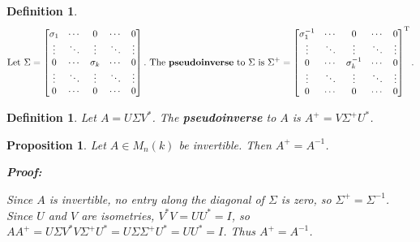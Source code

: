 \documentclass{article}
\theoremstyle{colontheorem}
\newtheorem{proposition}[theorem]{Proposition}
\newtheorem{definition}[theorem]{Definition}
\newenvironment{Proposition}
{
	\begin{mdframed}[backgroundcolor=TheoremOrange!10]
	\begin{proposition}
}
{
	\end{proposition}
	\end{mdframed}
	
	\vspace{.15in}
}
\newenvironment{Def}
{
	\begin{mdframed}[backgroundcolor=DefGreen!10]
	\begin{definition}
}
{
	\end{definition}
	\end{mdframed}
	
	\vspace{.15in}
}
\newenvironment{Proof}
{
	\begin{mdframed}[backgroundcolor=ProofPurple!10]
	\textbf{Proof:}%
}
{
	\end{mdframed}
	
	\vspace{.085in}
}
\begin{document}
\begin{Def}
	
	$$\textnormal{Let}\ \Sigma = \begin{bmatrix}
	
	\sigma_1 & \cdots & 0 & \cdots & 0\\
	\vdots & \ddots & \vdots & \ddots & \vdots\\
	0 & \cdots & \sigma_k & \cdots & 0\\
	\vdots & \ddots & \vdots & \ddots & \vdots\\
	0 & \cdots & 0 & \cdots & 0
	
	\end{bmatrix}.\ \textnormal{The \textbf{pseudoinverse} to}\ \Sigma\ \textnormal{is}\ \Sigma^+ = \begin{bmatrix}
	
	\sigma_1^{-1} & \cdots & 0 & \cdots & 0\\
	\vdots & \ddots & \vdots & \ddots & \vdots\\
	0 & \cdots & \sigma_k^{-1} & \cdots & 0\\
	\vdots & \ddots & \vdots & \ddots & \vdots\\
	0 & \cdots & 0 & \cdots & 0
	
	\end{bmatrix}^\textnormal{T}.
	$$
	
\end{Def}



\begin{Def}
	
	Let $A = U \Sigma V^*$. The \textbf{pseudoinverse} to $A$ is $A^+ = V \Sigma^+ U^*$.
	
\end{Def}



\begin{Proposition}
	
	Let $A \in M_n(k)$ be invertible. Then $A^+ = A^{-1}$.
	
	\begin{Proof}
		Since $A$ is invertible, no entry along the diagonal of $\Sigma$ is zero, so $\Sigma^+ = \Sigma^{-1}$. Since $U$ and $V$ are isometries, $V^* V = U U^* = I$, so $AA^+ = U \Sigma V^* V \Sigma^+ U^* = U \Sigma \Sigma^+ U^* = U U^* = I$. Thus $A^+ = A^{-1}$.
		
	\end{Proof}
	
\end{Proposition}
\end{document}
